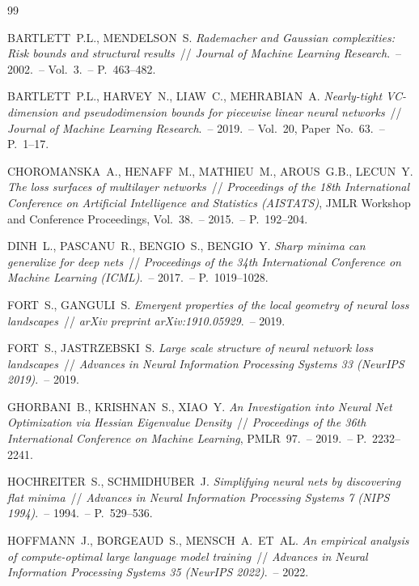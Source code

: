 \documentclass[11pt]{ubs}
\begin{document}
\begin{thebibliography}{99}

{\MakeUppercase{Bartlett~P.L., Mendelson~S.}}
\textit{Rademacher and Gaussian complexities: Risk bounds and structural results}~//
\emph{Journal of Machine Learning Research}.~-- 2002.~-- Vol.~3.~-- P.~463--482.

{\MakeUppercase{Bartlett~P.L., Harvey~N., Liaw~C., Mehrabian~A.}}
\textit{Nearly-tight VC-dimension and pseudodimension bounds for piecewise linear neural networks}~//
\emph{Journal of Machine Learning Research}.~-- 2019.~-- Vol.~20, Paper~No.~63.~-- P.~1--17.

{\MakeUppercase{Choromanska~A., Henaff~M., Mathieu~M., Arous~G.B., LeCun~Y.}}
\textit{The loss surfaces of multilayer networks}~//
\emph{Proceedings of the 18th International Conference on Artificial Intelligence and Statistics (AISTATS)}, JMLR Workshop and Conference Proceedings, Vol.~38.~-- 2015.~-- P.~192--204.

{\MakeUppercase{Dinh~L., Pascanu~R., Bengio~S., Bengio~Y.}}
\textit{Sharp minima can generalize for deep nets}~//
\emph{Proceedings of the 34th International Conference on Machine Learning (ICML)}.~-- 2017.~-- P.~1019--1028.

{\MakeUppercase{Fort~S., Ganguli~S.}}
\textit{Emergent properties of the local geometry of neural loss landscapes}~//
\emph{arXiv preprint arXiv:1910.05929}.~-- 2019.

{\MakeUppercase{Fort~S., Jastrzebski~S.}}
\textit{Large scale structure of neural network loss landscapes}~//
\emph{Advances in Neural Information Processing Systems 33 (NeurIPS 2019)}.~-- 2019.

{\MakeUppercase{Ghorbani~B., Krishnan~S., Xiao~Y.}}
\textit{An Investigation into Neural Net Optimization via Hessian Eigenvalue Density}~//
\emph{Proceedings of the 36th International Conference on Machine Learning}, PMLR~97.~-- 2019.~-- P.~2232--2241.


{\MakeUppercase{Hochreiter~S., Schmidhuber~J.}}
\textit{Simplifying neural nets by discovering flat minima}~//
\emph{Advances in Neural Information Processing Systems 7 (NIPS 1994)}.~-- 1994.~-- P.~529--536.

{\MakeUppercase{Hoffmann~J., Borgeaud~S., Mensch~A.~et~al.}}
\textit{An empirical analysis of compute-optimal large language model training}~//
\emph{Advances in Neural Information Processing Systems 35 (NeurIPS 2022)}.~-- 2022.


\end{thebibliography}
\end{document}
